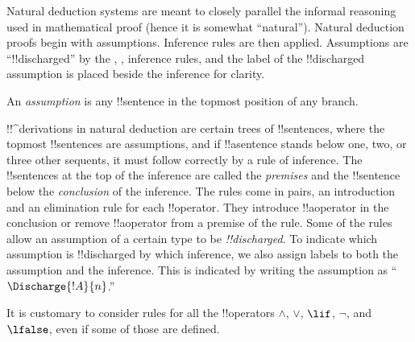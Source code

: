 \documentclass[../../../include/open-logic-section]{subfiles}
\begin{document}
      {}
      {}


\begin{explain}
Natural deduction systems are meant to closely parallel the informal
reasoning used in mathematical proof (hence it is somewhat
``natural''). Natural deduction proofs begin with assumptions.
Inference rules are then applied. Assumptions are ``!!{discharged}''
by the \Intro{\lnot}, \Intro{\lif},  inference rules, and the label of
the !!{discharged} assumption is placed beside the inference for
clarity.
\end{explain}

\begin{defn}[Assumption]
An \emph{assumption} is any !!{sentence}
in the topmost position of any branch.
\end{defn}

!!^{derivation}s in natural deduction are certain trees of
!!{sentence}s, where the topmost !!{sentence}s are assumptions, and if
!!a{sentence} stands below one, two, or three other sequents, it must
follow correctly by a rule of inference. The !!{sentence}s at the top
of the inference are called the \emph{premises} and the !!{sentence}
below the \emph{conclusion} of the inference.  The rules come in
pairs, an introduction and an elimination rule for each
!!{operator}. They introduce !!a{operator} in the conclusion or
remove !!a{operator} from a premise of the rule.  Some of the rules
allow an assumption of a certain type to be \emph{!!{discharged}}. To
indicate which assumption is !!{discharged} by which inference, we
also assign labels to both the assumption and the inference.  This is
indicated by writing the assumption as ``$\Discharge{!A}{n}$.''


%
	{It is customary to consider rules for all the !!{operator}s $\land$, $\lor$, $\lif$, $\lnot$, and $\lfalse$, even if some of those are defined.}
\end{document}
